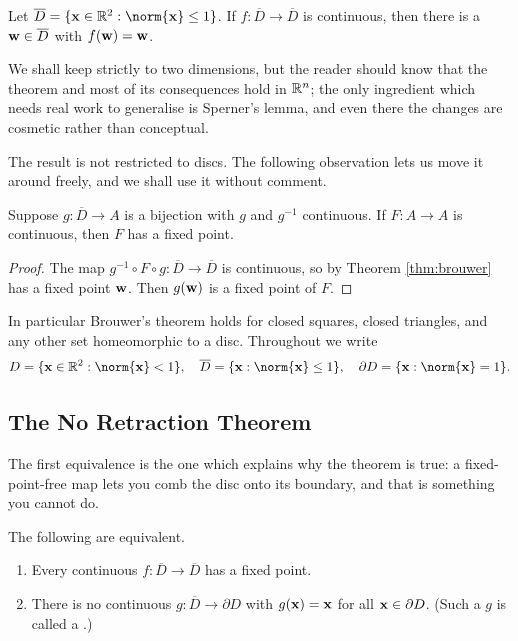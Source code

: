 \documentclass[a4paper]{scrartcl}
\newcommand{\dbar}{\overline{D}}
\begin{document}
\begin{theorem}\label{thm:brouwer}
	Let $\dbar = \{\vv{x} \in \R^2 : \norm{\vv{x}} \leq 1\}$. If $f : \dbar \to \dbar$ is continuous, then there is a $\vv{w} \in \dbar$ with $f(\mathbf{w}) = \mathbf{w}$.
\end{theorem}

We shall keep strictly to two dimensions, but the reader should know that the theorem and most of its consequences hold in $\mathbb{R}^n$; the only ingredient which needs real work to generalise is Sperner's lemma, and even there the changes are cosmetic rather than conceptual.

The result is not restricted to discs. The following observation lets us move it around freely, and we shall use it without comment.

\begin{lemma}\label{lem:homeo-transfer}
	Suppose $g : \dbar \to A$ is a bijection with $g$ and $g^{-1}$ continuous. If $F : A \to A$ is continuous, then $F$ has a fixed point.
\end{lemma}

\begin{proof}
	The map $g^{-1} \circ F \circ g : \dbar \to \dbar$ is continuous, so by Theorem \ref{thm:brouwer} has a fixed point $\mathbf{w}$. Then $g(\mathbf{w})$ is a fixed point of $F$.
\end{proof}

In particular Brouwer's theorem holds for closed squares, closed triangles, and any other set homeomorphic to a disc. Throughout we write
$$D = \{\vv{x} \in \R^2 : \norm{\vv{x}}<1\}, \quad \dbar = \{\vv{x}: \norm{\vv{x}}\leq 1\}, \quad \partial D = \{\vv{x} : \norm{\vv{x}}=1\}.$$

\subsection{The No Retraction Theorem}

The first equivalence is the one which explains why the theorem is true: a fixed-point-free map lets you comb the disc onto its boundary, and that is something you cannot do.

\begin{theorem}\label{thm:no-retract}
	The following are equivalent.
	\begin{enumerate}[label=(\roman*)]
		\item Every continuous $f : \dbar \to \dbar$ has a fixed point.
		\item There is no continuous $g : \dbar \to \partial D$ with $g(\mathbf{x}) = \mathbf{x}$ for all $\mathbf{x} \in \partial D$. (Such a $g$ is called a .)
	\end{enumerate}
\end{theorem}
\end{document}
